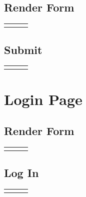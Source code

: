 \documentclass[12pt, letterpaper]{article}
\newcommand{\IPO}[3]{
  \begin{center}
    \begin{tabularx}{\linewidth}{XXX}
      \toprule
      \thead{Input} & \thead{Process} & \thead{Output} \\
      \midrule
      \RaggedRight{#1} & \RaggedRight{#2} & \RaggedRight{#3} \\
      \bottomrule
    \end{tabularx}
  \end{center}
}
\newcommand{\n}{\newline}
\begin{document}
\subsection{Render Form}\label{forgotForm}

\IPO{}{Render email address input\n Render submit button}{Form}

\subsection{Submit}

\IPO{\begin{enumerate}\item ``Submit'' button\item Email address (\texttt{string})\end{enumerate}}{Query database to find account associated with the inputted email address}{\textbf{IF} Account exists with email address\n$\Rightarrow$Send email to account's address with password reset link\n\textbf{ELSE}\n$\Rightarrow$Return to form, account doesn't exist (\ref{forgotForm})}

\section{Login Page}\label{login}

\subsection{Render Form}

\IPO{}{Render email address input\n Render password input\n Render ``forgot password'' link\n Render ``sign up'' link\n Render ``login'' button}{Form}

\subsection{Log In}

\IPO{\begin{enumerate}\item ``Login'' button\item Email address (\texttt{string})\item Password (\texttt{string})\end{enumerate}}{Use the destructured \texttt{logIn} function within Redwood's \texttt{useAuth} React hook\n~\n\textbf{IF} credentials match\n$\Rightarrow$ Save session in browser's cookies, so user is still logged in\n\textbf{ELSE}\n$\Rightarrow$Reject login}{\textbf{IF} login successful\n$\Rightarrow$ Go to the page the user was previously on}
\end{document}
